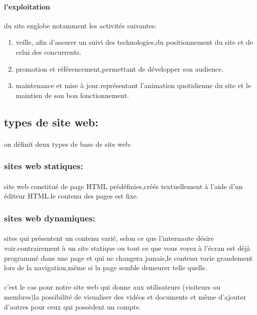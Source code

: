 \paragraph{l'exploitation}
du site englobe notamment les activités suivantes:
\begin{enumerate}
	\item veille, afin d'assurer un suivi des technologies,du positionnement du site et de celui des concurrents.
	\item promotion et référencement,permettant de développer son audience.
	\item maintenance et mise à jour.représentant l'animation quotidienne du site et le maintien de son bon fonctionnement.
\end{enumerate}
\subsection{types de site web:}
\paragraph{}
on définit deux types de base de site web:
\subsubsection{sites web statiques:}
\paragraph{}
site web constitué de page HTML prédéfinies,créés textuellement à l'aide d'un éditeur HTML.le contenu des pages est fixe.
\subsubsection{sites web dynamiques:}
\paragraph{}
sites qui présentent un contenu varié, selon ce que l'internaute désire voir.contrairement à un site statique ou tout ce que vous voyez à l'écran est déjà programmé dans une page et qui ne changera jamais,le contenu varie grandement lors de la navigation,même si la page semble demeurer telle quelle.
\paragraph{}
c'est le cas pour notre site web qui donne aux utilisateurs (visiteurs ou membres)la possibilité de visualiser des vidéos et documents et même d'ajouter d'autres pour ceux qui possèdent un compte.
